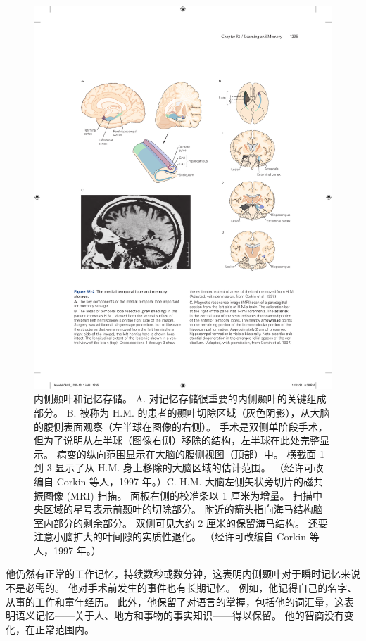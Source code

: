 \begin{figure}[htbp]
	\centering
	\includegraphics[width=0.9\linewidth]{chap52/fig_52_2}
	\caption{内侧颞叶和记忆存储。 A. 对记忆存储很重要的内侧颞叶的关键组成部分。 B. 被称为 H.M. 的患者的颞叶切除区域（灰色阴影），从大脑的腹侧表面观察（左半球在图像的右侧）。 手术是双侧单阶段手术，但为了说明从左半球（图像右侧）移除的结构，左半球在此处完整显示。 病变的纵向范围显示在大脑的腹侧视图（顶部）中。 横截面 1 到 3 显示了从 H.M. 身上移除的大脑区域的估计范围。 （经许可改编自 Corkin 等人，1997 年。）C. H.M. 大脑左侧矢状旁切片的磁共振图像 (MRI) 扫描。 面板右侧的校准条以 1 厘米为增量。 扫描中央区域的星号表示前颞叶的切除部分。 附近的箭头指向海马结构脑室内部分的剩余部分。 双侧可见大约 2 厘米的保留海马结构。 还要注意小脑扩大的叶间隙的实质性退化。 （经许可改编自 Corkin 等人，1997 年。）}
	\label{fig:52_2}
\end{figure}


他仍然有正常的工作记忆，持续数秒或数分钟，这表明内侧颞叶对于瞬时记忆来说不是必需的。
他对手术前发生的事件也有长期记忆。
例如，他记得自己的名字、从事的工作和童年经历。
此外，他保留了对语言的掌握，包括他的词汇量，这表明语义记忆——关于人、地方和事物的事实知识——得以保留。
他的智商没有变化，在正常范围内。


